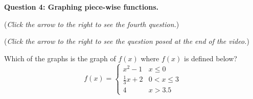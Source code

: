 \documentclass{ximera}
\begin{document}
\textbf{Question 4: Graphing piece-wise functions.}
\begin{question}
\begin{flushright}
{\color{blue}(\emph{Click the arrow to the right to see the fourth question.})}
\end{flushright}
\begin{center}
\begin{expandable}
\begin{flushright}
{\color{blue}(\emph{Click the arrow to the right to see the question
posed at the end of the video.})}
\end{flushright}
\begin{expandable}
Which of the graphs is the graph of $f(x)$ where $f(x)$ is defined below?
\[ f(x) = \begin{cases} 
      x^2-1 & x \leq 0 \\
     \frac{1}{3} x + 2 & 0< x \leq 3 \\
    4 & x>3.5
   \end{cases} \]


\end{expandable}
\end{expandable}
\end{center}
\end{question}
\end{document}
